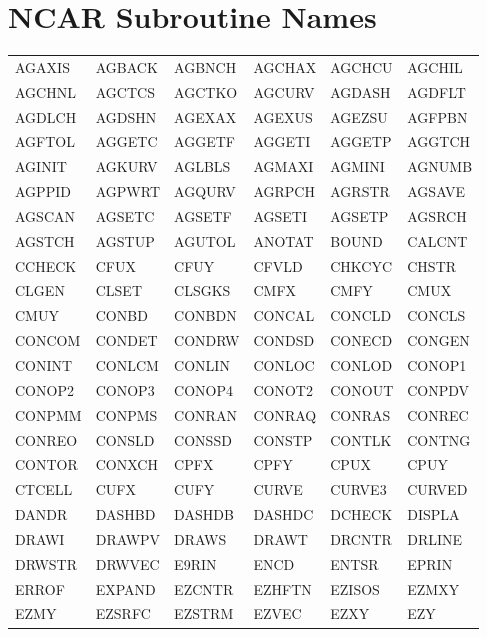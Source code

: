 \documentclass[twoside,11pt,nolof,noabs]{starlink}
\begin{document}
\newpage
\section{NCAR Subroutine Names}
\label{list_sect}

\begin{center}
\ttfamily
\latex{\begin{scriptsize}}
\begin{tabular}{p{20mm}p{20mm}p{20mm}p{20mm}p{20mm}p{20mm}}
AGAXIS & AGBACK & AGBNCH & AGCHAX & AGCHCU & AGCHIL\\
AGCHNL & AGCTCS & AGCTKO & AGCURV & AGDASH & AGDFLT\\
AGDLCH & AGDSHN & AGEXAX & AGEXUS & AGEZSU & AGFPBN\\
AGFTOL & AGGETC & AGGETF & AGGETI & AGGETP & AGGTCH\\
AGINIT & AGKURV & AGLBLS & AGMAXI & AGMINI & AGNUMB\\
AGPPID & AGPWRT & AGQURV & AGRPCH & AGRSTR & AGSAVE\\
AGSCAN & AGSETC & AGSETF & AGSETI & AGSETP & AGSRCH\\
AGSTCH & AGSTUP & AGUTOL & ANOTAT & BOUND  & CALCNT\\
CCHECK & CFUX   & CFUY   & CFVLD  & CHKCYC & CHSTR\\
CLGEN  & CLSET  & CLSGKS & CMFX   & CMFY   & CMUX\\
CMUY   & CONBD  & CONBDN & CONCAL & CONCLD & CONCLS\\
CONCOM & CONDET & CONDRW & CONDSD & CONECD & CONGEN\\
CONINT & CONLCM & CONLIN & CONLOC & CONLOD & CONOP1\\
CONOP2 & CONOP3 & CONOP4 & CONOT2 & CONOUT & CONPDV\\
CONPMM & CONPMS & CONRAN & CONRAQ & CONRAS & CONREC\\
CONREO & CONSLD & CONSSD & CONSTP & CONTLK & CONTNG\\
CONTOR & CONXCH & CPFX   & CPFY   & CPUX   & CPUY\\
CTCELL & CUFX   & CUFY   & CURVE  & CURVE3 & CURVED\\
DANDR  & DASHBD & DASHDB & DASHDC & DCHECK & DISPLA\\
DRAWI  & DRAWPV & DRAWS  & DRAWT  & DRCNTR & DRLINE\\
DRWSTR & DRWVEC & E9RIN  & ENCD   & ENTSR  & EPRIN\\
ERROF  & EXPAND & EZCNTR & EZHFTN & EZISOS & EZMXY\\
EZMY   & EZSRFC & EZSTRM & EZVEC  & EZXY   & EZY\\

\end{tabular}
\end{center}
\end{document}
